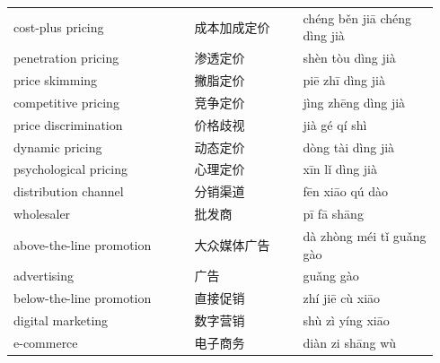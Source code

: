 \documentclass[11pt]{article}
\begin{document}
\begin{longtable}{@{}p{0.40\linewidth}p{0.24\linewidth}p{0.30\linewidth}@{}}
cost-plus pricing & 成本加成定价 & chéng běn jiā chéng dìng jià \\
penetration pricing & 渗透定价 & shèn tòu dìng jià \\
price skimming & 撇脂定价 & piē zhī dìng jià \\
competitive pricing & 竞争定价 & jìng zhēng dìng jià \\
price discrimination & 价格歧视 & jià gé qí shì \\
dynamic pricing & 动态定价 & dòng tài dìng jià \\
psychological pricing & 心理定价 & xīn lǐ dìng jià \\
distribution channel & 分销渠道 & fēn xiāo qú dào \\
wholesaler & 批发商 & pī fā shāng \\
above-the-line promotion & 大众媒体广告 & dà zhòng méi tǐ guǎng gào \\
advertising & 广告 & guǎng gào \\
below-the-line promotion & 直接促销 & zhí jiē cù xiāo \\
digital marketing & 数字营销 & shù zì yíng xiāo \\
e-commerce & 电子商务 & diàn zi shāng wù \\
\end{longtable}
\end{document}
